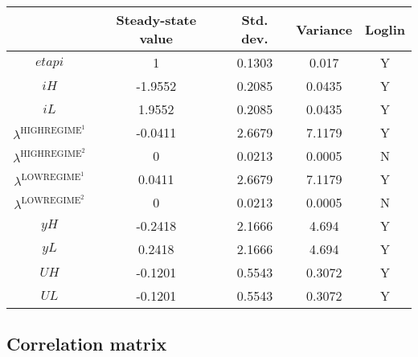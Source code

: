 \begin{tabular}{c|c|c|c|c|}
  & Steady-state value & Std. dev. & Variance & Loglin\\
\hline
${e\!t\!a\!p\!i}$ & 1 & 0.1303 & 0.017 & Y    \\
${i\!H}$ & -1.9552 & 0.2085 & 0.0435 & Y    \\
${i\!L}$ & 1.9552 & 0.2085 & 0.0435 & Y    \\
$\lambda^{\mathrm{HIGHREGIME}^{\mathrm{1}}}$ & -0.0411 & 2.6679 & 7.1179 & Y    \\
$\lambda^{\mathrm{HIGHREGIME}^{\mathrm{2}}}$ & 0 & 0.0213 & 0.0005 & N    \\
$\lambda^{\mathrm{LOWREGIME}^{\mathrm{1}}}$ & 0.0411 & 2.6679 & 7.1179 & Y    \\
$\lambda^{\mathrm{LOWREGIME}^{\mathrm{2}}}$ & 0 & 0.0213 & 0.0005 & N    \\
${y\!H}$ & -0.2418 & 2.1666 & 4.694 & Y    \\
${y\!L}$ & 0.2418 & 2.1666 & 4.694 & Y    \\
${U\!H}$ & -0.1201 & 0.5543 & 0.3072 & Y    \\
${U\!L}$ & -0.1201 & 0.5543 & 0.3072 & Y    \\
\hline
\end{tabular}


\subsection{Correlation matrix}

